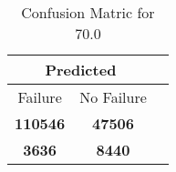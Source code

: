 \begin{table}[] 
\caption{Confusion Matric for 70.0} 
\label{Table: Prediction Accuracy-None70.0SVMEKF-ignoreReflection-Reflection} 
\centering 
\begin{tabular} 
 {@{}ccc@{}} 
\toprule 
\multicolumn{2}{c}{\textbf{Predicted}}
 \\ \midrule 
\multicolumn{1}{|c|}{Failure} & 
\multicolumn{1}{c|}{No Failure}
 \\ \midrule 
\multicolumn{1}{|c|}{\color{green}\textbf{110546}} & 
\multicolumn{1}{c|}{\color{green}\textbf{47506}}
 \\ \midrule 
\multicolumn{1}{|c|}{\color{red}\textbf{3636}} & 
\multicolumn{1}{c|}{\color{red}\textbf{8440}}
 \\ \bottomrule 
\end{tabular} 
\end{table} 
